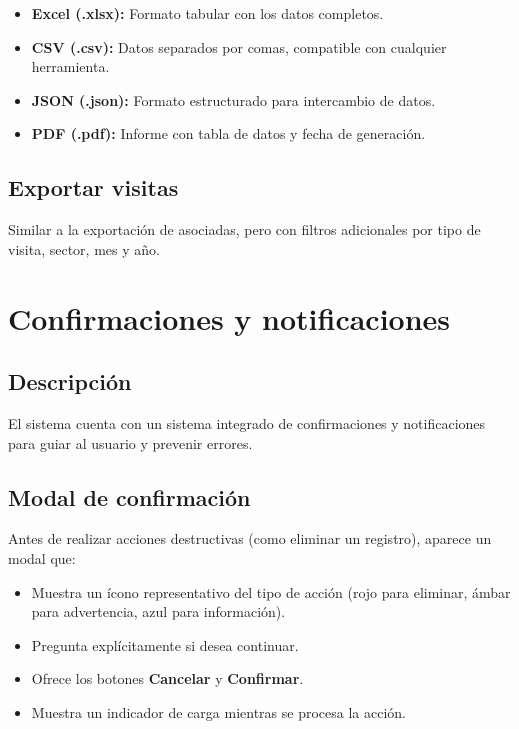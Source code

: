 \documentclass[12pt]{article}
\begin{document}
\begin{itemize}[nosep]
  \item \textbf{Excel (.xlsx):} Formato tabular con los datos completos.
  \item \textbf{CSV (.csv):} Datos separados por comas, compatible con cualquier herramienta.
  \item \textbf{JSON (.json):} Formato estructurado para intercambio de datos.
  \item \textbf{PDF (.pdf):} Informe con tabla de datos y fecha de generación.
\end{itemize}

\subsection{Exportar visitas}
Similar a la exportación de asociadas, pero con filtros adicionales por tipo de visita, sector, mes y año.

\section{Confirmaciones y notificaciones}
\label{sec:notificaciones}

\subsection{Descripción}
\label{subsec:notificaciones-descripcion}

El sistema cuenta con un sistema integrado de confirmaciones y notificaciones para guiar al usuario y prevenir errores.

\subsection{Modal de confirmación}
Antes de realizar acciones destructivas (como eliminar un registro), aparece un modal que:

\begin{itemize}[nosep]
  \item Muestra un ícono representativo del tipo de acción (rojo para eliminar, ámbar para advertencia, azul para información).
  \item Pregunta explícitamente si desea continuar.
  \item Ofrece los botones \textbf{Cancelar} y \textbf{Confirmar}.
  \item Muestra un indicador de carga mientras se procesa la acción.
\end{itemize}
\end{document}

